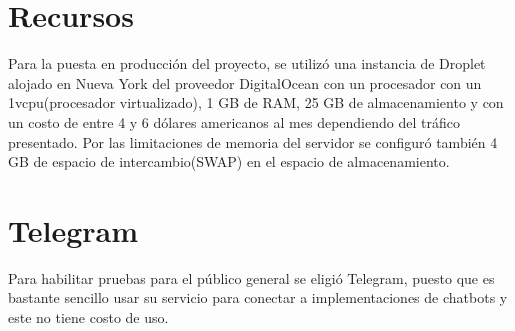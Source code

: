 \section{Recursos}

Para la puesta en producción del proyecto, se utilizó una instancia de Droplet alojado en Nueva York del proveedor DigitalOcean con un procesador con un 1vcpu(procesador virtualizado), 1 GB de RAM, 25 GB de almacenamiento y con un costo de entre 4 y 6 dólares americanos al mes dependiendo del tráfico presentado. Por las limitaciones de memoria del servidor se configuró también 4 GB de espacio de intercambio(SWAP) en el espacio de almacenamiento.  

\section{Telegram}

Para habilitar pruebas para el público general se eligió Telegram, puesto que es bastante sencillo usar su servicio para conectar a implementaciones de chatbots y este no tiene costo de uso. \cite{botfather}
